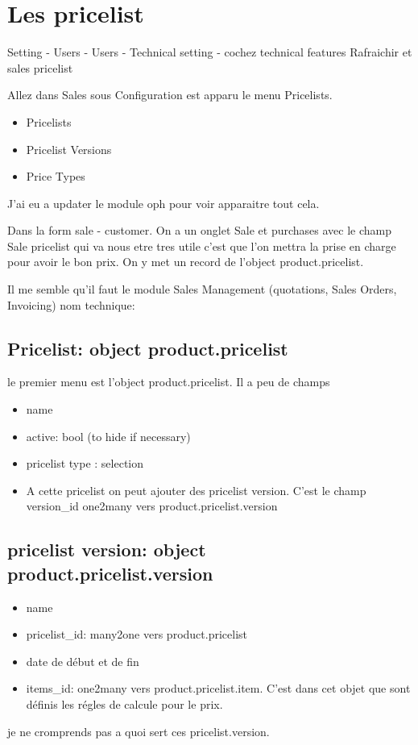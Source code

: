 \documentclass[12pt,a4paper]{article}
\begin{document}
\section{Les pricelist}
\label{sec:princelit}

Setting - Users - Users - Technical setting - cochez technical features Rafraichir  et sales pricelist

Allez dans Sales sous Configuration est apparu le menu Pricelists. 
\begin{itemize}
\item Pricelists
\item Pricelist Versions
\item Price Types
\end{itemize}

J'ai eu a updater le module oph pour voir apparaitre tout cela.

Dans la form sale - customer. On a un onglet Sale et purchases avec le champ  Sale pricelist  qui va nous etre tres utile c'est que l'on mettra la prise en charge pour avoir le bon prix. On y met un record de l'object product.pricelist.

Il me semble qu'il faut le module Sales Management (quotations, Sales Orders, Invoicing) nom technique: 

\subsection{Pricelist: object product.pricelist}
\label{sec:pricelist_obj}

le premier menu est l'object product.pricelist. Il  a peu de champs
\begin{itemize}
\item name
\item active: bool (to hide if necessary)
\item pricelist type : selection
\item A cette pricelist on peut ajouter des pricelist version. C'est le champ version\_id one2many vers product.pricelist.version
\end{itemize}

\subsection{pricelist version: object product.pricelist.version}
\label{sec:pricelist_version}

\begin{itemize}
\item name
\item pricelist\_id: many2one vers product.pricelist
\item date de début et de fin
\item items\_id: one2many vers product.pricelist.item. C'est dans cet objet que sont définis les régles de calcule pour le prix. 
\end{itemize}
je ne cromprends pas a quoi sert ces pricelist.version.
\end{document}
